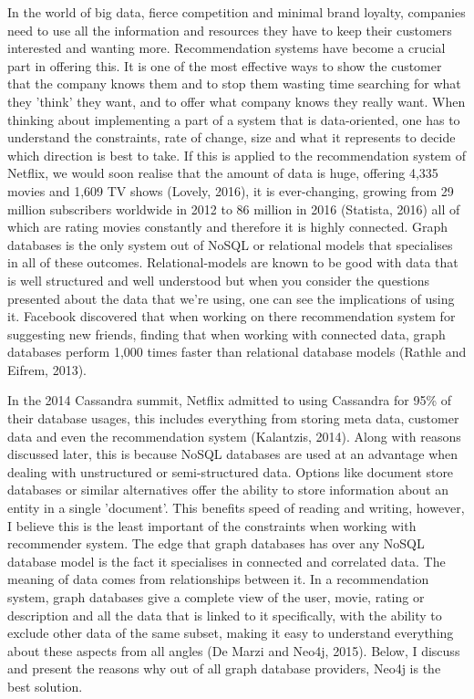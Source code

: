 \documentclass[a4paper]{article}
\begin{document}
\justify

In the world of big data, fierce competition and minimal brand loyalty, companies need to use all the information and resources they have to keep their customers interested and wanting more. Recommendation systems have become a crucial part in offering this. It is one of the most effective ways to show the customer that the company knows them and to stop them wasting time searching for what they 'think' they want, and to offer what company knows they really want. When thinking about implementing a part of a system that is data-oriented, one has to understand the constraints, rate of change, size and what it represents to decide which direction is best to take. If this is applied to the recommendation system of Netflix, we would soon realise that the amount of data is huge, offering 4,335 movies and 1,609 TV shows (Lovely, 2016), it is ever-changing, growing from 29 million subscribers worldwide in 2012 to 86 million in 2016 (Statista, 2016) all of which are rating movies constantly and therefore it is highly connected. Graph databases is the only system out of NoSQL or relational models that specialises in all of these outcomes. Relational-models are known to be good with data that is well structured and well understood but when you consider the questions presented about the data that we're using, one can see the implications of using it. Facebook discovered that when working on there recommendation system for suggesting new friends, finding that when working with connected data, graph databases perform 1,000 times faster than relational database models (Rathle and Eifrem, 2013).

In the 2014 Cassandra summit, Netflix admitted to using Cassandra for 95\% of their database usages, this includes everything from storing meta data, customer data and even the recommendation system (Kalantzis, 2014). Along with reasons discussed later, this is because NoSQL databases are used at an advantage when dealing with unstructured or semi-structured data. Options like document store databases or similar alternatives offer the ability to store information about an entity in a single 'document'. This benefits speed of reading and writing, however, I believe this is the least important of the constraints when working with recommender system. The edge that graph databases has over any NoSQL database model is the fact it specialises in connected and correlated data. The meaning of data comes from relationships between it. In a recommendation system, graph databases give a complete view of the user, movie, rating or description and all the data that is linked to it specifically, with the ability to exclude other data of the same subset, making it easy to understand everything about these aspects from all angles (De Marzi and Neo4j, 2015). Below, I discuss and present the reasons why out of all graph database providers, Neo4j is the best solution. \par
\end{document}
